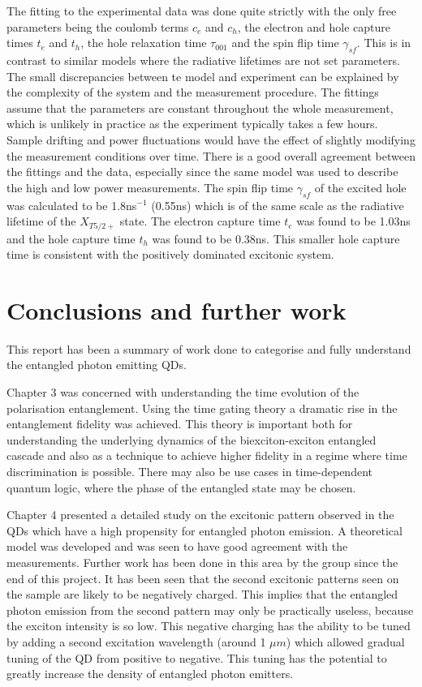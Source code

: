 \documentclass[12pt, twoside]{article}
\numberwithin{equation}{section}
\begin{document}
The fitting to the experimental data was done quite strictly with the
only free parameters being the coulomb terms $c_e$ and $c_h$, the
electron and hole capture times $t_e$ and $t_h$, the hole relaxation
time $\tau_{001}$ and the spin flip time $\gamma_{sf}$. This is in
contrast to similar models where the radiative lifetimes are not set
parameters. The small discrepancies between te model and experiment can
be explained by the complexity of the system and the measurement
procedure. The fittings assume that the parameters are constant
throughout the whole measurement, which is unlikely in practice as the
experiment typically takes a few hours. Sample drifting and power
fluctuations would have the effect of slightly modifying the measurement
conditions over time. There is a good overall agreement between the
fittings and the data, especially since the same model was used to
describe the high and low power measurements. The spin flip time
$\gamma_{sf}$ of the excited hole was calculated to be 1.8ns$^{-1}$
(0.55ns) which is of the same scale as the radiative lifetime of the
$X_{T5/2+}$ state. The electron capture time $t_e$ was found to be
1.03ns and the hole capture time $t_h$ was found to be 0.38ns. This
smaller hole capture time is consistent with the positively dominated
excitonic system.

\newpage
\section{Conclusions and further work}

This report has been a summary of work done to categorise and fully
understand the entangled photon emitting QDs.

Chapter 3 was concerned with understanding the time evolution of the
polarisation entanglement. Using the time gating theory a dramatic rise
in the entanglement fidelity was achieved. This theory is important both
for understanding the underlying dynamics of the biexciton-exciton
entangled cascade and also as a technique to achieve higher fidelity in
a regime where time discrimination is possible. There may also be use
cases in time-dependent quantum logic, where the phase of the entangled
state may be chosen.

Chapter 4 presented a detailed study on the excitonic pattern observed
in the QDs which have a high propensity for entangled photon emission. A
theoretical model was developed and was seen to have good agreement with
the measurements. Further work has been done in this area by the group
since the end of this project. It has been seen that the second
excitonic patterns seen on the sample are likely to be negatively
charged. This implies that the entangled photon emission from the second
pattern may only be practically useless, because the exciton intensity
is so low. This negative charging has the ability to be tuned by adding
a second excitation wavelength (around 1 $\mu m$) which allowed gradual
tuning of the QD from positive to negative. This tuning has the
potential to greatly increase the density of entangled photon emitters.
\end{document}
